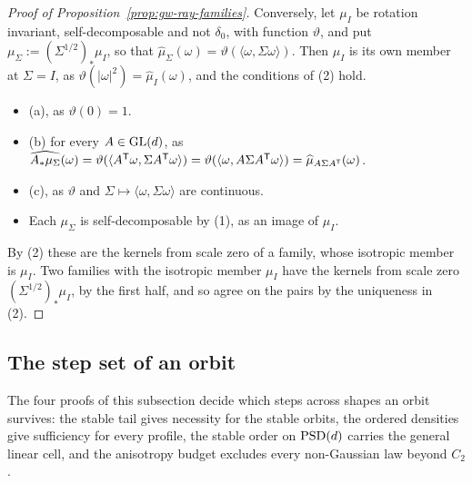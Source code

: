 \begin{proof}[Proof of Proposition~\ref{prop:gw-ray-families}]
Conversely, let $\mu_I$ be rotation invariant, self-decomposable and not $\delta_0$, with function $\vartheta$,
and put $\mu_\Sigma := (\Sigma^{1/2})_*\mu_I$, so that $\widehat\mu_\Sigma(\omega) =
\vartheta(\langle\omega,\Sigma\omega\rangle)$. Then $\mu_I$ is its own member at $\Sigma = I$, as
$\vartheta(|\omega|^2) = \widehat\mu_I(\omega)$, and the conditions of (2) hold.
\begin{itemize}
\item (a), as $\vartheta(0) = 1$.
\item (b) for every $A \in \mathrm{GL}(d)$, as $\widehat{A_*\mu_\Sigma}(\omega) =
\vartheta(\langle A^{\mathsf{T}}\omega,\Sigma A^{\mathsf{T}}\omega\rangle) = \vartheta(\langle\omega,A\Sigma A^{\mathsf{T}}\omega\rangle) =
\widehat\mu_{A\Sigma A^{\mathsf{T}}}(\omega)$.
\item (c), as $\vartheta$ and $\Sigma \mapsto \langle\omega,\Sigma\omega\rangle$ are continuous.
\item Each $\mu_\Sigma$ is self-decomposable by (1), as an image of $\mu_I$.
\end{itemize} By (2) these are the kernels from scale zero of a
family, whose isotropic member is $\mu_I$. Two families with the isotropic member $\mu_I$ have the
kernels from scale zero $(\Sigma^{1/2})_*\mu_I$, by the first half, and so agree on the pairs by the
uniqueness in (2).
\end{proof}

\subsection{The step set of an orbit}\label{app:wedge-axis-steps}

The four proofs of this subsection decide which steps across shapes an orbit survives: the stable tail
gives necessity for the stable orbits, the ordered densities give sufficiency for every profile, the
stable order on $\mathrm{PSD}(d)$ carries the general linear cell, and the anisotropy budget excludes every
non-Gaussian law beyond $C_2$.

